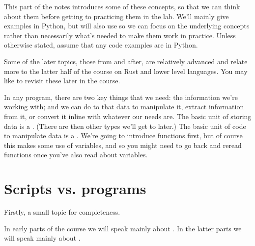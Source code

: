 \documentclass[letterpaper,10pt,british]{sphinxmanual}
\begin{document}
\sphinxAtStartPar
This part of the notes introduces some of these concepts, so that we can think about them  before getting to practicing them in the lab. We’ll mainly give examples in Python, but will also use {\hyperref[\detokenize{chapters/software_development_tools/pseudocode:pseudocode}]{}} so we can focus on the underlying concepts rather than necessarily what’s needed to make them work in practice. Unless otherwise stated, assume that any code examples are in Python.

\sphinxAtStartPar
Some of the later topics, those from {\hyperref[\detokenize{chapters/programming_fundamentals/stack_and_heap:stack-and-heap}]{}} and after, are relatively advanced and relate more to the latter half of the course on Rust and lower level languages. You may like to revisit these later in the course.

\sphinxAtStartPar
In any program, there are two key things that we need:  the information we’re working with; and  we can do to that data to manipulate it, extract information from it, or convert it in\sphinxhyphen{}line with whatever our needs are. The basic unit of storing data is a {\hyperref[\detokenize{chapters/programming_fundamentals/variables:variables}]{}}. (There are then other types we’ll get to later.) The basic unit of code to manipulate data is a {\hyperref[\detokenize{chapters/programming_fundamentals/functions:functions}]{}}. We’re going to introduce functions first, but of course this makes some use of variables, and so you might need to go back and re\sphinxhyphen{}read functions once you’ve also read about variables.

\sphinxstepscope


\section{Scripts vs. programs}
\label{\detokenize{chapters/programming_fundamentals/scripts:scripts-vs-programs}}\label{\detokenize{chapters/programming_fundamentals/scripts::doc}}
\sphinxAtStartPar
Firstly, a small topic for completeness.

\sphinxAtStartPar
In early parts of the course we will speak mainly about . In the latter parts we will speak mainly about .
\end{document}
